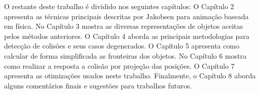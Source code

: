 O restante deste trabalho é dividido nos seguintes capítulos: O Capítulo 2 apresenta as técnicas principais descritas por Jakobsen para animação baseada em física. No Capítulo 3 mostra as diversas representações de objetos aceitas pelos métodos anteriores. O Capítulo 4 aborda as principais metodologias para detecção de colisões e seus casos degenerados. O Capítulo 5 apresenta como calcular de forma simplificada as fronteiras dos objetos. No Capítulo 6 mostra como realizar a resposta a colisão por projeção das posições. O Capítulo 7 apresenta as otimizações usados neste trabalho. Finalmente, o Capítulo 8 aborda alguns comentários finais e sugestões para trabalhos futuros.
